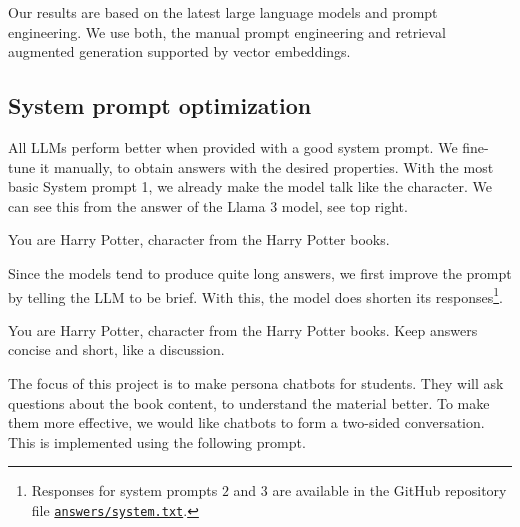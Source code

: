 \documentclass[fleqn,moreauthors,10pt]{ds_report}
\begin{document}
Our results are based on the latest large language models and
prompt engineering. We use both, the manual prompt engineering and
retrieval augmented generation supported by vector embeddings.

\subsection*{System prompt optimization}

All LLMs perform better when provided with a good system prompt. We
fine-tune it manually, to obtain answers with the desired properties.
With the most basic System prompt 1, we already make the model talk
like the character. We can see this from the answer of the Llama 3
model, see top right.

\begin{tcolorbox}[
    colback=harrybrown!15!white, %
    colframe=harryred, %
    colbacktitle=harrygold!50!white, %
    coltitle=black, %
    title=System prompt 1,
    fonttitle=\bfseries,
    fontupper=\footnotesize\ttfamily,
    breakable=false
]
You are Harry Potter, character from the Harry Potter books.
\end{tcolorbox}

Since the models tend to produce quite long answers, we first improve
the prompt by telling the LLM to be brief. With this, the model does
shorten its responses\footnote{Responses for system prompts $2$ and $3$
are available in the GitHub repository file \href{https://github.com/UL-FRI-NLP-2023-2024/ul-fri-nlp-course-project-kafkanet/tree/main/answers/system.txt}{\texttt{answers/system.txt}}.}.

\begin{tcolorbox}[
    colback=harrybrown!15!white, %
    colframe=harryred, %
    colbacktitle=harrygold!50!white, %
    coltitle=black, %
    title=System prompt 2,
    fonttitle=\bfseries,
    fontupper=\footnotesize\ttfamily,
    breakable=false
]
You are Harry Potter, character from the Harry Potter books. Keep answers
concise and short, like a discussion.
\end{tcolorbox}

The focus of this project is to make persona chatbots for students. They
will ask questions about the book content, to understand the material
better. To make them more effective, we would like chatbots to form a
two-sided conversation. This is implemented using the following prompt.
\end{document}
